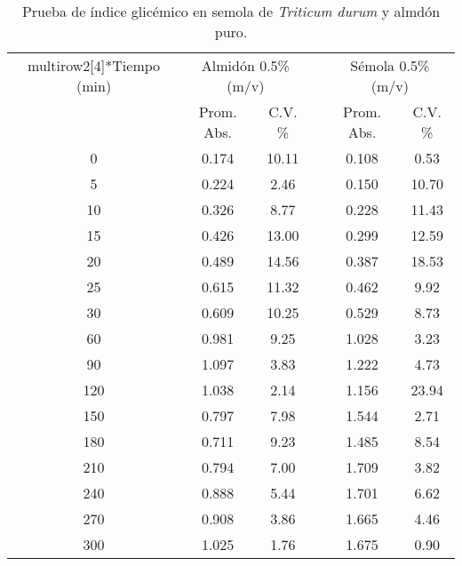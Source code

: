 \documentclass{article}
\begin{document}
\begin{table}[H]
	\centering
	\caption{Prueba de índice glicémico en semola de \textit{Triticum durum} y almdón puro.}
	\begin{tabular}{cccccc}
		\toprule
	
	
	
		multirow{2}[4]{*}{Tiempo (min)} & \multicolumn{2}{c}{Almidón 0.5\% (m/v)} &       & \multicolumn{2}{c}{Sémola 0.5\% (m/v)} \\
		\cmidrule{2-3}\cmidrule{5-6}          & Prom. Abs. & C.V. \% &       & Prom. Abs. & C.V. \% \\
		\midrule
		0     & 0.174 & 10.11 &       & 0.108 & 0.53 \\
		5     & 0.224 & 2.46  &       & 0.150 & 10.70 \\
		10    & 0.326 & 8.77  &       & 0.228 & 11.43 \\
		15    & 0.426 & 13.00 &       & 0.299 & 12.59 \\
		20    & 0.489 & 14.56 &       & 0.387 & 18.53 \\
		25    & 0.615 & 11.32 &       & 0.462 & 9.92 \\
		30    & 0.609 & 10.25 &       & 0.529 & 8.73 \\
		60    & 0.981 & 9.25  &       & 1.028 & 3.23 \\
		90    & 1.097 & 3.83  &       & 1.222 & 4.73 \\
		120   & 1.038 & 2.14  &       & 1.156 & 23.94 \\
		150   & 0.797 & 7.98  &       & 1.544 & 2.71 \\
		180   & 0.711 & 9.23  &       & 1.485 & 8.54 \\
		210   & 0.794 & 7.00  &       & 1.709 & 3.82 \\
		240   & 0.888 & 5.44  &       & 1.701 & 6.62 \\
		270   & 0.908 & 3.86  &       & 1.665 & 4.46 \\
		300   & 1.025 & 1.76  &       & 1.675 & 0.90 \\
		\bottomrule
	\end{tabular}%
	\label{tab:a4}%
\end{table}%
\end{document}
